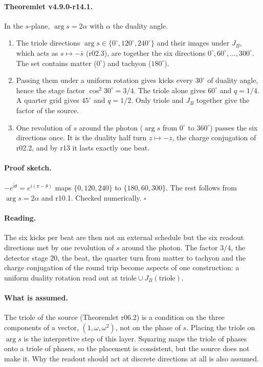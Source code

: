 \paragraph{Theoremlet v4.9.0-r14.1.}
In the \(s\)-plane, \(\arg s=2\alpha\) with \(\alpha\) the duality angle.
\begin{enumerate}[leftmargin=2em]
\item[(a)] The triole directions \(\arg s\in\{0^\circ,120^\circ,240^\circ\}\) and their images under \(J_B\), which acts as
\(s\mapsto-\bar s\) (r02.3), are together the six directions \(0^\circ,60^\circ,\dots,300^\circ\).  The set contains matter
(\(0^\circ\)) and tachyon (\(180^\circ\)).
\item[(b)] Passing them under a uniform rotation gives kicks every \(30^\circ\) of duality angle, hence the stage factor
\(\cos^2 30^\circ=3/4\).  The triole alone gives \(60^\circ\) and \(q=1/4\).  A quarter grid gives \(45^\circ\) and \(q=1/2\).
Only triole and \(J_B\) together give the factor of the source.
\item[(c)] One revolution of \(s\) around the photon (\(\arg s\) from \(0^\circ\) to \(360^\circ\)) passes the six directions once.
It is the duality half turn \(z\mapsto-z\), the charge conjugation of r02.2, and by r13 it lasts exactly one beat.
\end{enumerate}

\paragraph{Proof sketch.}
\(-\overline{e^{i\theta}}=e^{i(\pi-\theta)}\) maps \(\{0,120,240\}\) to \(\{180,60,300\}\).  The rest follows from
\(\arg s=2\alpha\) and r10.1.  Checked numerically.  \(\square\)

\paragraph{Reading.}
The six kicks per beat are then not an external schedule but the six readout directions met by one revolution of \(s\)
around the photon.  The factor \(3/4\), the detector stage \(20\), the beat, the quarter turn from matter to tachyon and the
charge conjugation of the round trip become aspects of one construction: a uniform duality rotation read out at
\(\text{triole}\cup J_B(\text{triole})\).

\paragraph{What is assumed.}
The triole of the source (Theoremlet r06.2) is a condition on the three components of a vector, \((1,\omega,\omega^2)\), not on
the phase of \(s\).  Placing the triole on \(\arg s\) is the interpretive step of this layer.  Squaring maps the triole of
phases onto a triole of phases, so the placement is consistent, but the source does not make it.  Why the readout should
act at discrete directions at all is also assumed.

